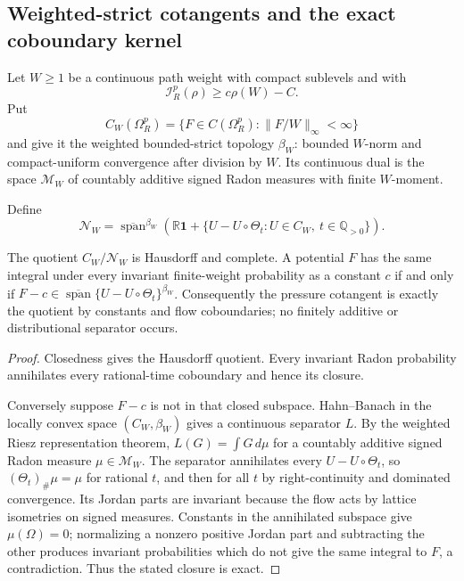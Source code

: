 \subsection{Weighted-strict cotangents and the exact coboundary kernel}

Let \(W\ge1\) be a continuous path weight with compact sublevels and with
\[
 \mathcal I_R^p(\rho)\ge c\rho(W)-C.
\]
Put
\[
 C_W(\Omega_R^p)
 =\{F\in C(\Omega_R^p):\|F/W\|_\infty<\infty\}
\]
and give it the weighted bounded-strict topology \(\beta_W\): bounded
\(W\)-norm and compact-uniform convergence after division by \(W\).  Its
continuous dual is the space \(\mathcal M_W\) of countably additive signed
Radon measures with finite \(W\)-moment.

Define
\[
 \mathscr N_W=
 \overline{\operatorname{span}}^{\beta_W}
 \left(
 \mathbb R\mathbf1+
 \{U-U\circ\Theta_t:
 U\in C_W,\ t\in\mathbb Q_{>0}\}
 \right).
\]

\begin{theorem}
\label{thm:r3-a3-cotangent}
The quotient \(C_W/\mathscr N_W\) is Hausdorff and complete.  A potential
\(F\) has the same integral under every invariant finite-weight probability
as a constant \(c\) if and only if
\(F-c\in\overline{\operatorname{span}}
\{U-U\circ\Theta_t\}^{\beta_W}\).  Consequently the pressure cotangent is
exactly the quotient by constants and flow coboundaries; no finitely additive
or distributional separator occurs.
\end{theorem}

\begin{proof}
Closedness gives the Hausdorff quotient.  Every invariant Radon probability
annihilates every rational-time coboundary and hence its closure.

Conversely suppose \(F-c\) is not in that closed subspace.  Hahn--Banach in
the locally convex space \((C_W,\beta_W)\) gives a continuous separator
\(L\).  By the weighted Riesz representation theorem, \(L(G)=\int G\,d\mu\)
for a countably additive signed Radon measure \(\mu\in\mathcal M_W\).  The
separator annihilates every \(U-U\circ\Theta_t\), so
\((\Theta_t)_\#\mu=\mu\) for rational \(t\), and then for all \(t\) by
right-continuity and dominated convergence.  Its Jordan parts are invariant
because the flow acts by lattice isometries on signed measures.  Constants in
the annihilated subspace give \(\mu(\Omega)=0\); normalizing a nonzero positive
Jordan part and subtracting the other produces invariant probabilities which
do not give the same integral to \(F\), a contradiction.  Thus the stated
closure is exact.
\end{proof}

